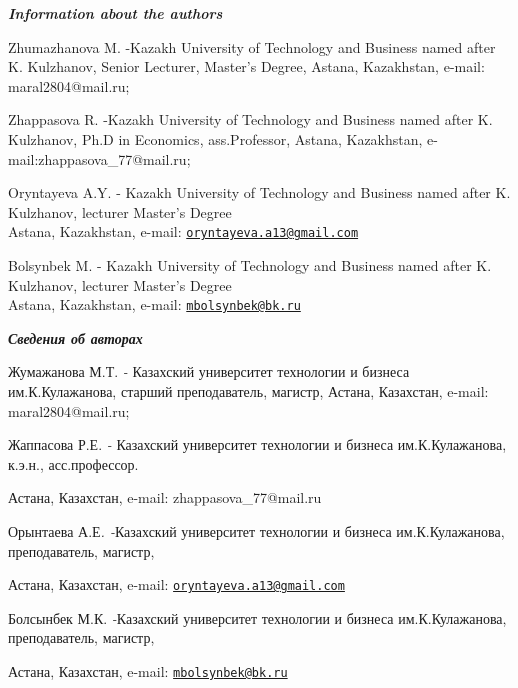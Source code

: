 \begin{authorinfo}
\emph{{\bfseries Information about the authors}}

Zhumazhanova M. -Kazakh University of Technology and Business named
after K. Kulzhanov, Senior Lecturer, Master's Degree, Astana,
Kazakhstan, e-mail: maral2804@mail.ru;

Zhappasova R. -Kazakh University of Technology and Business named after
K. Kulzhanov, Ph.D in Economics, ass.Professor, Astana, Kazakhstan,
e-mail:zhappasova\_77@mail.ru;

Oryntayeva A.Y. - Kazakh University of Technology and Business named
after K. Kulzhanov, lecturer Master's Degree\\
Astana, Kazakhstan, e-mail:
\href{mailto:oryntayeva.a13@gmail.com}{\nolinkurl{oryntayeva.a13@gmail.com}}

Bolsynbek M. - Kazakh University of Technology and Business named after
K. Kulzhanov, lecturer Master's Degree\\
Astana, Kazakhstan, e-mail:
\href{mailto:mbolsynbek@bk.ru}{\nolinkurl{mbolsynbek@bk.ru}}

\emph{{\bfseries Сведения об авторах}}

Жумажанова М.Т. \emph{-} Казахский университет технологии и бизнеса
им.К.Кулажанова, старший преподаватель, магистр, Астана, Казахстан,
e-mail: maral2804@mail.ru;

Жаппасова Р.Е. \emph{-} Казахский университет технологии и бизнеса
им.К.Кулажанова, к.э.н., асс.профессор.

Астана, Казахстан, e-mail: zhappasova\_77@mail.ru

Орынтаева А.Е\emph{. -}Казахский университет технологии и бизнеса
им.К.Кулажанова, преподаватель, магистр,

Астана, Казахстан, e-mail:
\href{mailto:oryntayeva.a13@gmail.com}{\nolinkurl{oryntayeva.a13@gmail.com}}

Болсынбек М.К. \emph{-}Казахский университет технологии и бизнеса
им.К.Кулажанова, преподаватель, магистр,

Астана, Казахстан, e-mail:
\href{mailto:mbolsynbek@bk.ru}{\nolinkurl{mbolsynbek@bk.ru}}
\end{authorinfo}
